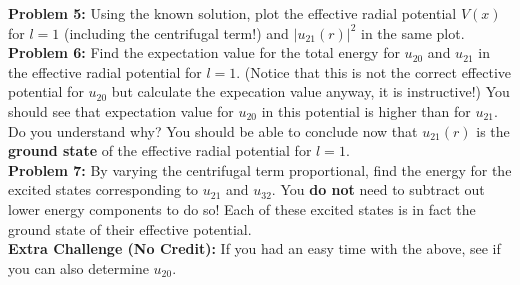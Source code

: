 \documentclass[12pt]{article}
\begin{document}
\noindent
{\bf Problem 5:} Using the known solution, plot the effective radial potential
$V(x)$ for $l=1$ (including the centrifugal term!) and $|u_{21}(r)|^2$ in the same plot.\\[5pt]

\noindent
{\bf Problem 6:} Find the expectation value for the total energy for
$u_{20}$ and $u_{21}$ in the effective radial potential for $l=1$.
(Notice that this is not the correct effective potential for $u_{20}$
but calculate the expecation value anyway, it is instructive!)  You
should see that expectation value for $u_{20}$ in this potential is
higher than for $u_{21}$.  Do you understand why?  You should be able
to conclude now that $u_{21}(r)$ is the {\bf ground state} of the
effective radial potential for $l=1$.\\[5pt]

\noindent
{\bf Problem 7:} By varying the centrifugal term proportional, find
the energy for the excited states corresponding to $u_{21}$ and
$u_{32}$.  You {\bf do not} need to subtract out lower energy
components to do so!  Each of these excited states is in fact the
ground state of their effective potential.\\[5pt]

\noindent
{\bf Extra Challenge (No Credit):} If you had an easy time with the
above, see if you can also determine $u_{20}$.\\[5pt]
\end{document}
